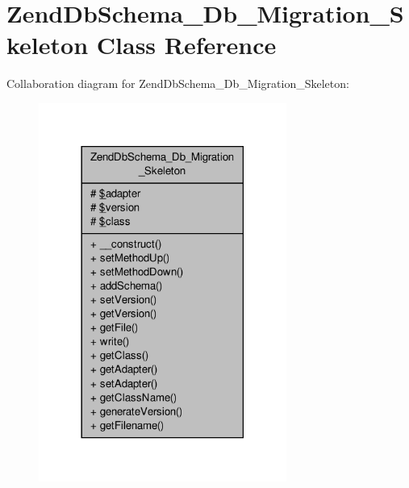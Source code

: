\hypertarget{classZendDbSchema__Db__Migration__Skeleton}{\section{Zend\-Db\-Schema\-\_\-\-Db\-\_\-\-Migration\-\_\-\-Skeleton Class Reference}
\label{classZendDbSchema__Db__Migration__Skeleton}
}


Collaboration diagram for Zend\-Db\-Schema\-\_\-\-Db\-\_\-\-Migration\-\_\-\-Skeleton\-:\nopagebreak
\begin{figure}[H]
\begin{center}
\leavevmode
\includegraphics[width=230pt]{classZendDbSchema__Db__Migration__Skeleton__coll__graph}
\end{center}
\end{figure}
